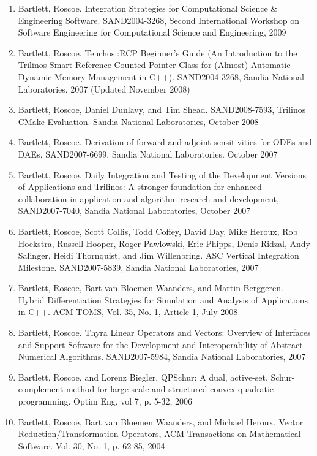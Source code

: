 \documentclass{report}
\begin{document}
\begin{enumerate}
%
{}\item Bartlett, Roscoe. Integration Strategies for Computational Science \& Engineering Software.  SAND2004-3268, Second International Workshop on Software Engineering for Computational Science and Engineering, 2009
%
{}\item Bartlett, Roscoe. Teuchos::RCP Beginner's Guide (An Introduction to the Trilinos Smart Reference-Counted Pointer Class for (Almost) Automatic Dynamic Memory Management in C++).  SAND2004-3268, Sandia National Laboratories, 2007 (Updated November 2008)
%
{}\item Bartlett, Roscoe, Daniel Dunlavy, and Tim Shead. SAND2008-7593, Trilinos CMake Evaluation. Sandia National Laboratories, October 2008
%
{}\item Bartlett, Roscoe. Derivation of forward and adjoint sensitivities for ODEs and DAEs, SAND2007-6699, Sandia National Laboratories. October 2007
%
{}\item Bartlett, Roscoe. Daily Integration and Testing of the Development Versions of Applications and Trilinos: A stronger foundation for enhanced collaboration in application and algorithm research and development, SAND2007-7040, Sandia National Laboratories, October 2007
%
{}\item Bartlett, Roscoe, Scott Collis, Todd Coffey, David Day, Mike Heroux, Rob Hoekstra, Russell Hooper, Roger Pawlowski, Eric Phipps, Denis Ridzal, Andy Salinger, Heidi Thornquist, and Jim Willenbring. ASC Vertical Integration Milestone. SAND2007-5839, Sandia National Laboratories, 2007
%
{}\item Bartlett, Roscoe, Bart van Bloemen Waanders, and Martin Berggeren. Hybrid Differentiation Strategies for Simulation and Analysis of Applications in C++. ACM TOMS, Vol. 35, No. 1, Article 1,
July 2008
%
{}\item Bartlett, Roscoe. Thyra Linear Operators and Vectors: Overview of Interfaces and Support Software for the Development and Interoperability of Abstract Numerical Algorithms. SAND2007-5984, Sandia National Laboratories, 2007
%
{}\item Bartlett, Roscoe, and Lorenz Biegler. QPSchur: A dual, active-set, Schur-complement method for large-scale and structured convex quadratic programming. Optim Eng, vol 7, p. 5-32, 2006
%
{}\item Bartlett, Roscoe, Bart van Bloemen Waanders, and Michael Heroux. Vector Reduction/Transformation Operators, ACM Transactions on Mathematical Software. Vol. 30, No. 1, p. 62-85, 2004
%
\end{enumerate}
\end{document}
